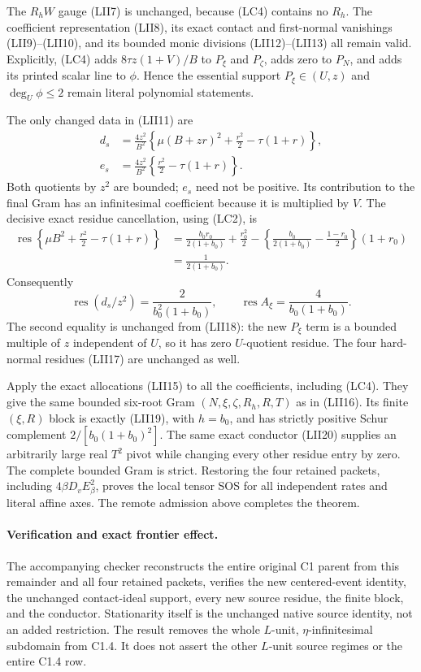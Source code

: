 The $R_hW$ gauge (LII7) is unchanged, because (LC4) contains no
$R_h$.  The coefficient representation (LII8), its exact contact
and first-normal vanishings (LII9)--(LII10), and its bounded monic
divisions (LII12)--(LII13) all remain valid.  Explicitly, (LC4)
adds $8\tau z(1+V)/B$ to $P_\xi$ and $P_\zeta$, adds zero to
$P_N$, and adds its printed scalar line to $\phi$.  Hence the
essential support $P_\xi\in(U,z)$ and $\deg_U\phi\le2$ remain
literal polynomial statements.

The only changed data in (LII11) are
\[
\begin{split}
 d_s&=\frac{4z^2}{B^2}
   \left\{\mu(B+zr)^2+\frac{r^2}{2}-\tau(1+r)\right\},\\
 e_s&=\frac{4z^2}{B^2}
   \left\{\frac{r^2}{2}-\tau(1+r)\right\}.
\end{split}                                             \tag{LC5}
\]
Both quotients by $z^2$ are bounded; $e_s$ need not be positive.
Its contribution to the final Gram has an infinitesimal coefficient
because it is multiplied by $V$.  The decisive exact residue
cancellation, using (LC2), is
\[
 \begin{split}
 \operatorname{res}\left\{
 \mu B^2+\frac{r^2}{2}-\tau(1+r)\right\}
 &=\frac{b_0r_0}{2(1+b_0)}+\frac{r_0^2}{2}
 -\left\{\frac{b_0}{2(1+b_0)}-\frac{1-r_0}{2}\right\}(1+r_0)\\
 &=\frac1{2(1+b_0)}.
 \end{split}                                             \tag{LC6}
\]
Consequently
\[
 \operatorname{res}(d_s/z^2)=\frac2{b_0^2(1+b_0)},\qquad
 \operatorname{res}A_\xi=\frac4{b_0(1+b_0)}.              \tag{LC7}
\]
The second equality is unchanged from (LII18): the new $P_\xi$
term is a bounded multiple of $z$ independent of $U$, so it has
zero $U$-quotient residue.  The four hard-normal residues (LII17)
are unchanged as well.

Apply the exact allocations (LII15) to all the coefficients,
including (LC4).  They give the same bounded six-root Gram
$(N,\xi,\zeta,R_h,R,T)$ as in (LII16).  Its finite $(\xi,R)$
block is exactly (LII19), with $h=b_0$, and has strictly positive
Schur complement $2/[b_0(1+b_0)^2]$.  The same exact conductor
(LII20) supplies an arbitrarily large real $T^2$ pivot while
changing every other residue entry by zero.  The complete bounded
Gram is strict.  Restoring the four retained packets, including
$4\beta D_vE_\beta^2$, proves the local tensor SOS for all
independent rates and literal affine axes.  The remote admission
above completes the theorem.

\paragraph{Verification and exact frontier effect.}
The accompanying checker reconstructs the entire original C1 parent
from this remainder and all four retained packets, verifies the new
centered-event identity, the unchanged contact-ideal support, every
new source residue, the finite block, and the conductor.  Stationarity
itself is the unchanged native source identity, not an added
restriction.  The result removes the whole $L$-unit, $\eta$-infinitesimal
subdomain from C1.4.  It does not assert the other $L$-unit source
regimes or the entire C1.4 row.
